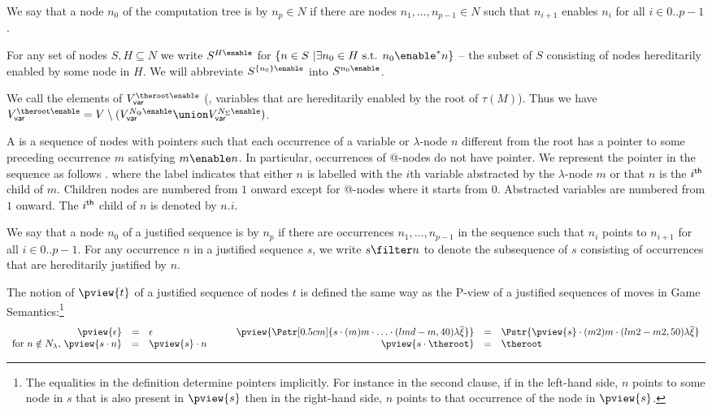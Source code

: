 We say that a node $n_0$ of the computation tree is
 by $n_p \in N$ if there are nodes
$n_1,\ldots, n_{p-1} \in N$ such that $n_{i+1}$ enables $n_{i}$ for
all $i\in 0..p-1$.

For any set of nodes $S, H \subseteq N$ we write $S^{H\enable}$ for
$\{ n \in S \ | \exists n_0 \in H \mbox{
s.t. }n_0  \enable^* n \}$ -- the subset of $S$ consisting of nodes
hereditarily enabled by some node in $H$. We will abbreviate
$S^{\{n_0\}\enable}$ into $S^{n_0\enable}$.

We call  the elements of $V_{\sf
var}^{\theroot\enable}$ (\ie, variables that are hereditarily enabled
by the root of $\tau(M)$). Thus we have $V_{\sf
var}^{\theroot\enable} = V \setminus ( V_{\sf var}^{N_@\enable}
\union V_{\sf var}^{N_\Sigma\enable})$.

A  is a sequence of nodes with
pointers such that each occurrence of a variable or $\lambda$-node
$n$ different from the root has a pointer to some preceding
occurrence $m$ satisfying $m \enable n$. In particular, occurrences
of @-nodes do not have pointer. We represent the pointer in the
sequence as follows .
 where the label indicates that either $n$ is labelled with the $i$th variable
abstracted by the $\lambda$-node $m$ or that $n$ is the $i^{\sf th}$
child of $m$.  Children nodes are numbered from $1$ onward except for
@-nodes where it starts from $0$. Abstracted variables are numbered
from $1$ onward. The $i^{\sf th}$ child of $n$ is denoted by $n.i$.

We say that a node $n_0$ of a justified sequence is
 by $n_p$ if there are occurrences $n_1,
\ldots, n_{p-1}$ in the sequence such that $n_i$ points to $n_{i+1}$
for all $i\in 0..p-1$. For any occurrence $n$ in a justified
sequence $s$, we write $s \filter n$ to denote the subsequence of
$s$ consisting of occurrences that are hereditarily justified by
$n$.


The notion of  $\pview{t}$ of a justified sequence of
nodes $t$ is defined the same way as the P-view of a justified
sequences of moves in Game Semantics:\footnote{ The equalities in the
  definition determine pointers implicitly. For instance in the second
  clause, if in the left-hand side, $n$ points to some node in $s$
  that is also present in $\pview{s}$ then in the right-hand side, $n$
  points to that occurrence of the node in $\pview{s}$.}
$$\begin{array}{rclrcl}
\pview{\epsilon} &=&  \epsilon
& \pview{\Pstr[0.5cm]{ s \cdot (m) m \cdot \ldots \cdot (lmd-m,40){\lambda\overline{\xi}}
}}
 &=& \Pstr{
\pview{s} \cdot (m2) m \cdot (lm2-m2,50) {\lambda \overline{\xi}} } \\
\mbox{for $n \notin N_\lambda$, } \pview{s \cdot n }  &=&  \pview{s} \cdot n \qquad
& \pview{s \cdot \theroot }  &=&  \theroot
\end{array}$$

